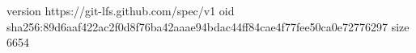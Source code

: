 version https://git-lfs.github.com/spec/v1
oid sha256:89d6aaf422ac2f0d8f76ba42aaae94bdac44ff84cae4f77fee50ca0e72776297
size 6654
